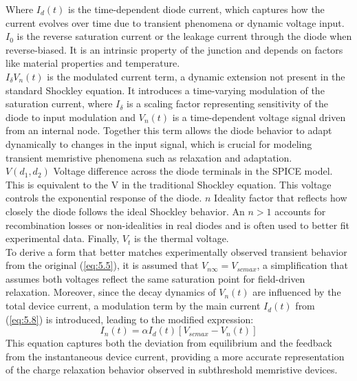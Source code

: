 \noindent Where $I_d(t)$ is the time-dependent diode current, which captures how the current evolves over time due to transient phenomena or dynamic voltage input. $I_0$ is the reverse saturation current or the leakage current through the diode when reverse-biased. It is an intrinsic property of the junction and depends on factors like material properties and temperature. \\

\noindent $I_{\delta} V_n(t)$ is the modulated current term, a dynamic extension not present in the standard Shockley equation. It introduces a time-varying modulation of the saturation current, where $I_{\delta}$ is a scaling factor representing sensitivity of the diode to input modulation and $V_n(t)$ is a time-dependent voltage signal driven from an internal node. Together this term allows the diode behavior to adapt dynamically to changes in the input signal, which is crucial for modeling transient memristive phenomena such as relaxation and adaptation.\\

\noindent $V(d_1,d_2)$ Voltage difference across the diode terminals in the SPICE model. This is equivalent to the V in the traditional Shockley equation. This voltage controls the exponential response of the diode. $n$ Ideality factor that reflects how closely the diode follows the ideal Shockley behavior. An $n>1$ accounts for recombination losses or non-idealities in real diodes and is often used to better fit experimental data. Finally, $V_t$ is the thermal voltage.\\

\noindent To derive a form that better matches experimentally observed transient behavior from the original (\ref{eq:5.5}), it is assumed that $V_{n\infty} = V_{scmax}$, a simplification that assumes both voltages reflect the same saturation point for field-driven relaxation. Moreover, since the decay dynamics of $V_n(t)$ are influenced by the total device current, a modulation term by the main current $I_d(t)$ from (\ref{eq:5.8}) is introduced, leading to the modified expression:
\begin{equation}
I_n(t) = \alpha I_d(t) \left[ V_{scmax} - V_n(t) \right] \label{eq:5.9}
\end{equation}
This equation captures both the deviation from equilibrium and the feedback from the instantaneous device current, providing a more accurate representation of the charge relaxation behavior observed in subthreshold memristive devices.\\

